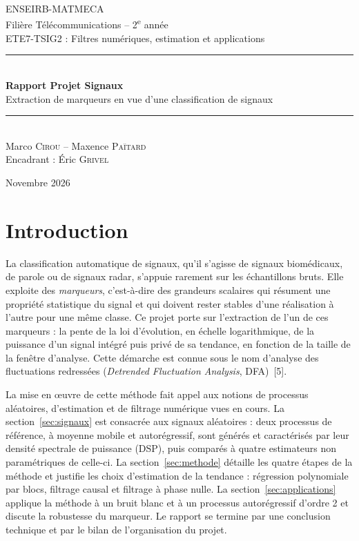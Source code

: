 \documentclass[11pt,a4paper]{article}
\begin{document}
\begin{titlepage}
  \centering
  {\large ENSEIRB-MATMECA}\\[0.2cm]
  {\large Filière Télécommunications -- 2\textsuperscript{e} année}\\[0.2cm]
  {\large ETE7-TSIG2 : Filtres numériques, estimation et applications}\\[3cm]

  \rule{\linewidth}{0.5pt}\\[0.4cm]
  {\LARGE\bfseries Rapport Projet Signaux}\\[0.3cm]
  {\large Extraction de marqueurs en vue d'une classification de signaux}\\
  \rule{\linewidth}{0.5pt}\\[3cm]

  {\large Marco \textsc{Cirou} \quad -- \quad Maxence \textsc{Païtard}}\\[1cm]
  {\large Encadrant : Éric \textsc{Grivel}}

  \vfill
  {\large Novembre 2026}
\end{titlepage}

\tableofcontents
\newpage

\section{Introduction}

La classification automatique de signaux, qu'il s'agisse de signaux biomédicaux, de parole ou de signaux radar, s'appuie rarement sur les échantillons bruts. Elle exploite des \emph{marqueurs}, c'est-à-dire des grandeurs scalaires qui résument une propriété statistique du signal et qui doivent rester stables d'une réalisation à l'autre pour une même classe. Ce projet porte sur l'extraction de l'un de ces marqueurs : la pente de la loi d'évolution, en échelle logarithmique, de la puissance d'un signal intégré puis privé de sa tendance, en fonction de la taille de la fenêtre d'analyse. Cette démarche est connue sous le nom d'analyse des fluctuations redressées (\emph{Detrended Fluctuation Analysis}, DFA)~[5].

La mise en œuvre de cette méthode fait appel aux notions de processus aléatoires, d'estimation et de filtrage numérique vues en cours. La section~\ref{sec:signaux} est consacrée aux signaux aléatoires : deux processus de référence, à moyenne mobile et autorégressif, sont générés et caractérisés par leur densité spectrale de puissance (DSP), puis comparés à quatre estimateurs non paramétriques de celle-ci. La section~\ref{sec:methode} détaille les quatre étapes de la méthode et justifie les choix d'estimation de la tendance : régression polynomiale par blocs, filtrage causal et filtrage à phase nulle. La section~\ref{sec:applications} applique la méthode à un bruit blanc et à un processus autorégressif d'ordre 2 et discute la robustesse du marqueur. Le rapport se termine par une conclusion technique et par le bilan de l'organisation du projet.
\end{document}
